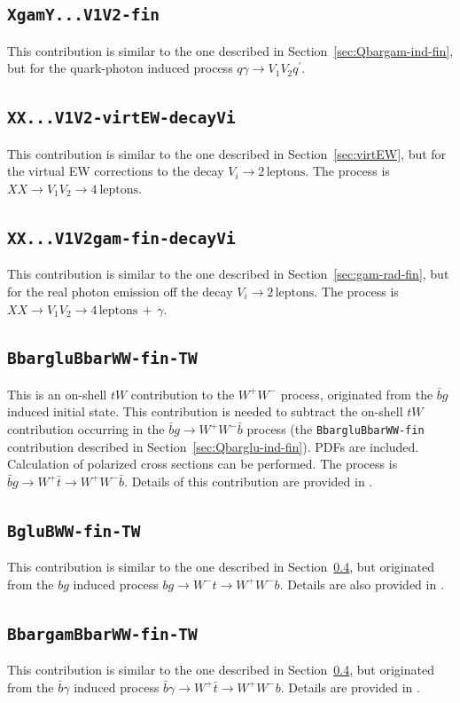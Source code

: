 \documentclass[english,12pt]{article}
\newcommand{\sect}[1]{Section~\ref{#1}}
\begin{document}
\subsection{\tt XgamY...V1V2-fin}
\label{sec:Qgam-ind-fin}
This contribution is similar to the one described in \sect{sec:Qbargam-ind-fin}, but for the 
quark-photon induced process $q\gamma \to V_1 V_2 q^\prime$.
\subsection{\tt XX...V1V2-virtEW-decayVi}
\label{sec:virtEW-decay}
This contribution is similar to the one described in \sect{sec:virtEW}, but for the 
virtual EW corrections to the decay $V_i\to 2\,\text{leptons}$. 
The process is $XX \to V_1 V_2 \to 4\ \text{leptons}$.
\subsection{\tt XX...V1V2gam-fin-decayVi}
\label{sec:gam-rad-fin-decay}
This contribution is similar to the one described in \sect{sec:gam-rad-fin}, but for the 
real photon emission off the decay $V_i\to 2\,\text{leptons}$. 
The process is $XX \to V_1 V_2 \to 4\,\text{leptons}\,+\,\gamma$.
\subsection{\tt BbargluBbarWW-fin-TW}
\label{sec:Bbarg-ind-fin-TW}
This is an on-shell $tW$ contribution to the $W^+W^-$ process, originated from the $\bar{b}g$ induced 
initial state. This contribution is needed to subtract the on-shell $tW$ contribution occurring in 
the $\bar{b}g \to W^+W^- \bar{b}$ process (the {\tt BbargluBbarWW-fin} contribution 
described in \sect{sec:Qbarglu-ind-fin}). 
PDFs are included. Calculation of polarized cross sections can be performed. 
The process is $\bar{b}g \to W^+ \bar{t} \to W^+W^-\bar{b}$.
Details of this contribution are provided in \cite{Dao:2024ffg}.
\subsection{\tt BgluBWW-fin-TW}
\label{sec:Bg-ind-fin-qcd-TW}
This contribution is similar to the one described in \sect{sec:Bbarg-ind-fin-TW}, but originated 
from the $bg$ induced process $bg \to W^- t \to W^+W^-b$.
Details are also provided in \cite{Dao:2024ffg}.
\subsection{\tt BbargamBbarWW-fin-TW}
\label{sec:Bbargam-ind-fin-TW}
This contribution is similar to the one described in \sect{sec:Bbarg-ind-fin-TW}, but originated 
from the $\bar{b}\gamma$ induced process $\bar{b}\gamma \to W^+ \bar{t} \to W^+W^-b$.
Details are provided in \cite{Dao:2024ffg}.
\end{document}
